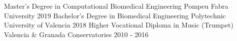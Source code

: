 \begin{cventries}
  \cventry
    {Master’s Degree in Computational Biomedical Engineering}
    {Pompeu Fabra University}
    {}
    {2019}
    {}
  \cventry
    {Bachelor’s Degree in Biomedical Engineering}
    {Polytechnic University of Valencia}
    {}
    {2018}
    {}
  \cventry
    {Higher Vocational Diploma in Music (Trumpet)}
    {Valencia \& Granada Conservatories}
    {}
    {2010 - 2016}
    {}
\end{cventries}